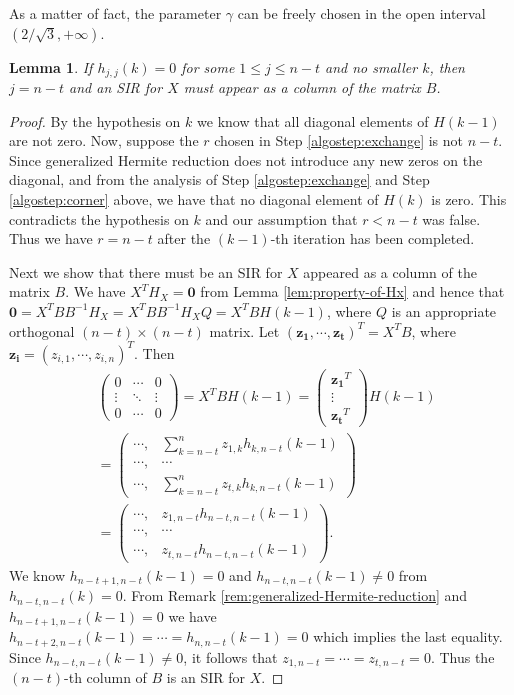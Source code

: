 \documentclass{sig-alternate}
\newtheorem{lem}[theorem]{Lemma}
\numberwithin{theorem}{section} \numberwithin{equation}{section}
\begin{document}
As a matter of fact, the parameter $\gamma$ can be freely chosen in
the open interval $(2/\sqrt{3}, +\infty)$.



\begin{lem}\label{lem:Hn,n-2=0}
If $h_{j,j}(k) = 0$ for some $1 \leq j \leq n - t$ and no smaller
$k$, then $j = n - t$ and an SIR for $X$ must appear as a column of
the matrix $B$.
\end{lem}
\begin{proof}
By the hypothesis on $k$ we know that all diagonal elements of $H(k
- 1)$ are not zero. Now, suppose the $r$ chosen in Step
\ref{algostep:exchange} is not $n-t$. Since generalized Hermite
reduction does not introduce any new zeros on the diagonal, and from
the analysis of Step \ref{algostep:exchange} and Step
\ref{algostep:corner} above, we have that no diagonal element of
$H(k)$ is zero. This contradicts the hypothesis on $k$ and our
assumption that $r < n - t$ was false. Thus we have $r = n - t$
after the $(k - 1)$-th iteration has been completed.

Next we show that there must be an SIR for $X$ appeared as a column
of the matrix $B$. We have $X^TH_{X} = \mathbf{0}$ from Lemma
\ref{lem:property-of-Hx} and hence that  $\mathbf{0} =
X^TBB^{-1}H_{X} = X^TBB^{-1}H_{X}Q = X^TBH(k - 1)$, where $Q$ is an
appropriate orthogonal $(n - t)\times(n - t)$ matrix. Let
$(\mathbf{z_1}, \cdots, \mathbf{z_t})^T = X^TB$, where
$\mathbf{z_i}=(z_{i,1},\cdots,z_{i,n})^T$. Then
 \[
 \begin{split}
&        \left
(\begin{matrix}0&\cdots&0\\
\vdots&\ddots &\vdots\\
0&\cdots&0\end{matrix}
 \right ) = X^TBH(k - 1) = \left (\begin{matrix}\mathbf{z_1}^T\\\vdots\\\mathbf{z_t}^T\end{matrix}
 \right )H(k - 1)\\&= \left
 (\begin{matrix}\cdots,&\sum_{k=n-t}^{n}z_{1,k}h_{k,n-t}(k-1)\\\cdots,&\cdots
\\\cdots,&\sum_{k=n-t}^{n}z_{t,k}h_{k,n-t}(k-1)\end{matrix}
 \right )\\
 &= \left (\begin{matrix}\cdots,&z_{1,n-t}h_{n-t, n-t}(k - 1)\\\cdots,&\cdots\\
 \cdots,&z_{t,n-t}h_{n-t, n-t}(k - 1)
 \end{matrix}
 \right ).
 \end{split}
 \]
We know $h_{n-t+1, n-t}(k - 1) =0$ and $h_{n-t, n-t}(k - 1) \neq 0$
from $h_{n-t, n-t}(k) = 0$. From Remark
\ref{rem:generalized-Hermite-reduction} and $h_{n-t+1, n-t}(k - 1)
=0$ we have $h_{n-t+2, n-t}(k - 1) = \cdots = h_{n, n-t}(k - 1) = 0$
which implies the last equality. Since $h_{n-t, n-t}(k - 1) \neq 0$,
it follows that $z_{1, n-t} = \cdots = z_{t, n-t} = 0$. Thus the $(n
- t)$-th column of $B$ is an SIR for $X$.
\end{proof}
\end{document}
